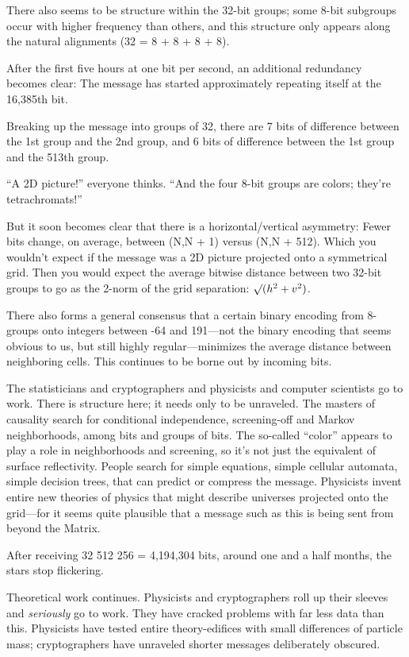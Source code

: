 {
 There also seems to be structure within the 32-bit groups; some
8-bit subgroups occur with higher frequency than others, and this
structure only appears along the natural alignments (32 = 8 + 8 + 8 +
8).}

{
 After the first five hours at one bit per second, an additional
redundancy becomes clear: The message has started approximately
repeating itself at the 16,385th bit.}

{
 Breaking up the message into groups of 32, there are 7 bits of
difference between the 1st group and the 2nd group, and 6 bits of
difference between the 1st group and the 513th group.}

{
 ``A 2D picture!'' everyone
thinks. ``And the four 8-bit groups are colors;
they're tetrachromats!''}

{
 But it soon becomes clear that there is a horizontal/vertical
asymmetry: Fewer bits change, on average, between (N,N + 1) versus (N,N
+ 512). Which you wouldn't expect if the message was a
2D picture projected onto a symmetrical grid. Then you would expect the
average bitwise distance between two 32-bit groups to go as the 2-norm
of the grid separation: ${\surd}(h^2 + v^2)$.}

{
 There also forms a general consensus that a certain binary
encoding from 8-groups onto integers between -64 and 191---not the
binary encoding that seems obvious to us, but still highly
regular---minimizes the average distance between neighboring cells.
This continues to be borne out by incoming bits.}

{
 The statisticians and cryptographers and physicists and computer
scientists go to work. There is structure here; it needs only to be
unraveled. The masters of causality search for conditional
independence, screening-off and Markov neighborhoods, among bits and
groups of bits. The so-called
``color'' appears to play a role in
neighborhoods and screening, so it's not just the
equivalent of surface reflectivity. People search for simple equations,
simple cellular automata, simple decision trees, that can predict or
compress the message. Physicists invent entire new theories of physics
that might describe universes projected onto the grid---for it seems
quite plausible that a message such as this is being sent from beyond
the Matrix.}

{
 After receiving 32 {\texttimes} 512 {\texttimes} 256 = 4,194,304
bits, around one and a half months, the stars stop flickering.}

{
 Theoretical work continues. Physicists and cryptographers roll up
their sleeves and \textit{seriously} go to work. They have cracked
problems with far less data than this. Physicists have tested entire
theory-edifices with small differences of particle mass; cryptographers
have unraveled shorter messages deliberately obscured.}

